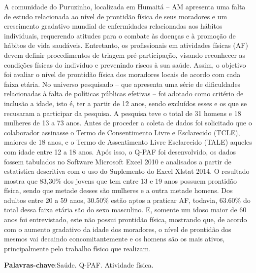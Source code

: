 \documentclass[article,12pt,onesidea,4paper,english,brazil]{abntex2}
\begin{document}
	\noindent A comunidade do Puruzinho, localizada em Humaitá – AM apresenta uma falta de
	estudo relacionada ao nível de prontidão física de seus moradores e um crescimento
	gradativo mundial de enfermidades relacionadas aos hábitos individuais, requerendo
	atitudes para o combate às doenças e à promoção de hábitos de vida saudáveis.
	Entretanto, os profissionais em atividades físicas (AF) devem definir procedimentos
	de triagem pré-participação, visando reconhecer as condições físicas do indivíduo e
	prevenindo riscos à sua saúde. Assim, o objetivo foi avaliar o nível de prontidão
	física dos moradores locais de acordo com cada faixa etária. No universo
	pesquisado – que apresenta uma série de dificuldades relacionadas à falta de
	políticas públicas efetivas – foi adotado como critério de inclusão a idade, isto é, ter
	a partir de 12 anos, sendo excluídos esses e os que se recusaram a participar da
	pesquisa. A pesquisa teve o total de 31 homens e 18 mulheres de 13 a 73 anos.
	Antes de proceder a coleta de dados foi solicitado que o colaborador assinasse o
	Termo de Consentimento Livre e Esclarecido (TCLE), maiores de 18 anos, e o
	Termo de Assentimento Livre Esclarecido (TALE) aqueles com idade entre 12 a 18
	anos. Após isso, o Q-PAF foi desenvolvido, os dados fossem tabulados no Software
	Microsoft Excel 2010 e analisados a partir de estatística descritiva com o uso do
	Suplemento do Excel Xlstat 2014. O resultado mostra que 83,30\% dos jovens que
	tem entre 13 e 19 anos possuem prontidão física, sendo que metade desses são
	mulheres e a outra metade homens. Dos adultos entre 20 a 59 anos, 30.50\% estão
	aptos a praticar AF, todavia, 63.60\% do total dessa faixa etária são do sexo
	masculino. E, somente um idoso maior de 60 anos foi entrevistado, este não possui
	prontidão física, mostrando que, de acordo com o aumento gradativo da idade dos
	moradores, o nível de prontidão dos mesmos vai decaindo concomitantemente e os
	homens são os mais ativos, principalmente pelo trabalho físico que realizam.
	
	\vspace{\onelineskip}
	
	\noindent
	\textbf{Palavras-chave}:Saúde. Q-PAF. Atividade física.
	
\end{document}
